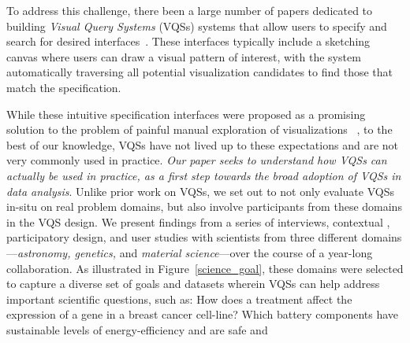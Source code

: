  To address this  challenge, there  been a large number of papers dedicated to building \emph{Visual Query Systems} (VQSs) systems that allow users to specify and search for desired  interfaces~\cite{mohebbi2011google,Hochheiser2004,wattenberg2001sketching,Siddiqui2017VLDB,ryall2005querylines,correll2016semantics,Mannino2018,Eichmann2015,Holz2009}. %
 These interfaces typically include a sketching canvas where users can draw a visual pattern of interest, with the system automatically traversing all potential visualization candidates to find those that match the specification. 
 \par While these intuitive specification interfaces were proposed as a promising solution to the problem of painful manual exploration of visualizations ~\cite{ryall2005querylines,wattenberg2001sketching}, to the best of our knowledge, VQSs have not lived up to these expectations and are not very commonly used in practice.  {\em Our paper seeks to understand how VQSs can actually be used in practice, as a first step towards the broad adoption of VQSs in data analysis}. Unlike prior work on VQSs, we set out to not only evaluate VQSs in-situ on real problem domains, but also involve participants from these domains in the VQS design. We present findings from a series of interviews, contextual , participatory design, and user studies with scientists from three different domains---{\em astronomy, genetics,} and {\em material science}---over the course of
 a year-long collaboration.  As illustrated in Figure~\ref{science_goal}, these domains were selected to capture a diverse set of goals and datasets wherein VQSs can help address important scientific questions, such as: How does a treatment affect the expression of a gene in a breast cancer cell-line? Which battery components have sustainable levels of energy-efficiency and are safe and
